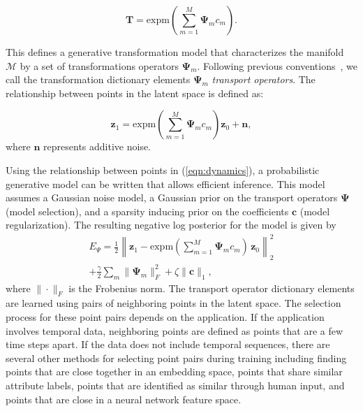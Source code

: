 \documentclass[letterpaper]{article} %
\newcommand{\mtx}[1]{\ensuremath{\mathbf{#1}}}
\newcommand{\vtr}[1]{\ensuremath{\mathbf{#1}}}
\begin{document}
\begin{equation}
\mtx{T} = \mathrm{expm}\left(\sum_{m=1}^M{\mtx{\Psi}_mc_m}\right).
\end{equation}

This defines a generative transformation model that characterizes the manifold $\mathcal{M}$ by a set of transformations operators $\mtx{\Psi}_m$. Following previous conventions~\cite{culpepper2009learning}, we call the transformation dictionary elements $\mtx{\Psi}_m$ \textit{transport operators}. The relationship between points in the latent space is defined as:

\begin{equation}
\vtr{z}_1 = \mathrm{expm}\left(\sum_{m=1}^M{\mtx{\Psi}_mc_m}\right)\vtr{z}_0 + \vtr{n}, \label{eqn:dynamics}
\end{equation}
where $\vtr{n}$ represents additive noise.

Using the relationship between points in (\ref{eqn:dynamics}), a probabilistic generative model can be written that allows efficient inference. This model assumes a Gaussian noise model, a Gaussian prior on the transport operators $\mtx{\Psi}$ (model selection), and a sparsity inducing prior on the coefficients $\vtr{c}$ (model regularization).  The resulting negative log posterior for the model is given by
\begin{equation} \label{eq:objFun}
\begin{split}
E_{\Psi} = \frac{1}{2}\left\|\vtr{z}_1 - \mathrm{expm}\left(\sum_{m=1}^M{\mtx{\Psi}_mc_m} \right) \, \vtr{z}_0\right\|_2^2 \\
+ \frac{\gamma}{2}\sum_m\|\mtx{\Psi}_m\|_F^2 +\zeta\|\vtr{c}\|_1,
\end{split}
\end{equation}
where $\|\cdot\|_F$ is the Frobenius norm. The transport operator dictionary elements are learned using pairs of neighboring points in the latent space. The selection process for these point pairs depends on the application. If the application involves temporal data, neighboring points are defined as points that are a few time steps apart. If the data does not include temporal sequences, there are several other methods for selecting point pairs during training including finding points that are close together in an embedding space, points that share similar attribute labels, points that are identified as similar through human input, and points that are close in a neural network feature space.
\end{document}
